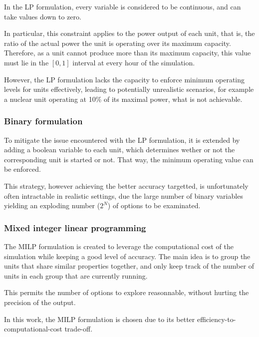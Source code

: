 In the LP formulation, every variable is considered to be continuous, and can take values down to zero.

In particular, this constraint applies to the power output of each unit, that is, the ratio of the actual power the unit is operating over its maximum capacity. Therefore, as a unit cannot produce more than its maximum capacity, this value must lie in the $[0, 1]$ interval at every hour of the simulation.

However, the LP formulation lacks the capacity to enforce minimum operating levels for units effectively, leading to potentially unrealistic scenarios, for example a nuclear unit operating at 10\% of its maximal power, what is not achievable.

\subsubsection{Binary formulation}

To mitigate the issue encountered with the LP formulation, it is extended by adding a boolean variable to each unit, which determines wether or not the corresponding unit is started or not. That way, the minimum operating value can be enforced.

This strategy, however achieving the better accuracy targetted, is unfortunately often intractable in realistic settings, due the large number of binary variables yielding an exploding number ($2^N$) of options to be examinated.

\subsubsection{Mixed integer linear programming \label{subsubsection:milp}}

The MILP formulation is created to leverage the computational cost of the simulation while keeping a good level of accuracy. The main idea is to group the units that share similar properties together, and only keep track of the number of units in each group that are currently running.

This permits the number of options to explore reasonnable, without hurting the precision of the output.

In this work, the MILP formulation is chosen due to its better efficiency-to-computational-cost trade-off.